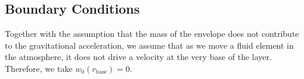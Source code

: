 \subsection{Boundary Conditions}

Together with the assumption that the mass of the envelope does not
contribute to the gravitational acceleration, we assume that as we move
a fluid element in the atmosphere, it does not drive a velocity at the very 
base of the layer.  Therefore, we take $w_0(r_\mathrm{base}) = 0$.



